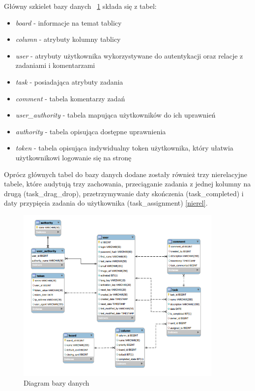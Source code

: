 Główny szkielet bazy danych  ~\ref{projektdb}
składa się z tabel:
\begin{itemize}
	\item \textit{board} - informacje na temat tablicy
	\item \textit{column} - atrybuty kolumny tablicy
		\item \textit{user} - atrybuty użytkownika wykorzystywane do autentykacji oraz relacje z zadaniami i komentarzami
			\item \textit{task} - posiadająca atrybuty zadania
			\item \textit{comment} - tabela komentarzy zadań
				\item \textit{user\_authority} - tabela mapująca użytkowników do ich uprawnień
				\item \textit{authority} - tabela opisująca dostępne uprawnienia
				\item \textit{token} - tabela opisująca indywidualny token użytkownika, który ułatwia użytkownikowi logowanie się na stronę
\end{itemize}

Oprócz głównych tabel do bazy danych dodane zostały również trzy nierelacyjne tabele, które audytują trzy zachowania, przeciąganie zadania z jednej kolumny na drugą (task\_drag\_drop), przetrzymywanie daty skończenia (task\_completed) i daty przypięcia zadania do użytkownika (task\_assignment) \ref{nierel}.

\begin{figure}[h]
	\centering
	\includegraphics[width=0.90\textwidth]{diagram-bazy}
	
	\caption{ Diagram bazy danych}
	\label{projektdb}
\end{figure}


